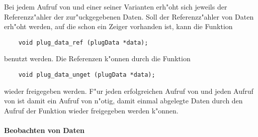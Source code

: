 Bei jedem Aufruf von  und einer seiner
Varianten erh"oht sich jeweils der Referenzz"ahler der
zur"uckgegebenen Daten. Soll der Referenzz"ahler von Daten erh"oht
werden, auf die schon ein Zeiger vorhanden ist, kann die Funktion
\begin{small}
\linespread{0.9}
\begin{verbatim}
    void plug_data_ref (plugData *data);
\end{verbatim}
\end{small}
benutzt werden. Die Referenzen k"onnen durch die Funktion
\begin{small}
\linespread{0.9}
\begin{verbatim}
    void plug_data_unget (plugData *data);
\end{verbatim}
\end{small}
wieder freigegeben werden. F"ur jeden erfolgreichen Aufruf von
 und jeden Aufruf von 
ist damit ein Aufruf von  n"otig, damit
einmal abgelegte Daten durch den Aufruf der Funktion 
wieder freigegeben werden k"onnen.

\paragraph{Beobachten von Daten}\hfill\\

